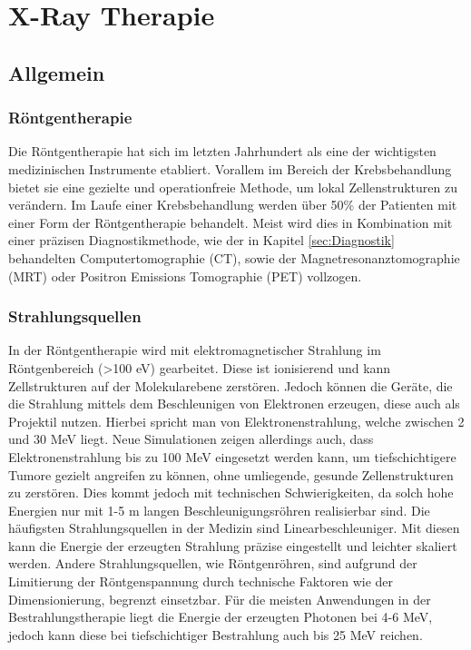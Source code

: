 \newpage
\section{X-Ray Therapie}

\subsection{Allgemein}


\subsubsection{Röntgentherapie}
Die Röntgentherapie hat sich im letzten Jahrhundert als eine der wichtigsten medizinischen Instrumente etabliert.
Vorallem im Bereich der Krebsbehandlung bietet sie eine gezielte und operationfreie Methode, um lokal Zellenstrukturen zu verändern.
Im Laufe einer Krebsbehandlung werden über 50\% der Patienten mit einer Form der Röntgentherapie behandelt.
Meist wird dies in Kombination mit einer präzisen Diagnostikmethode, wie der in Kapitel \ref{sec:Diagnostik} behandelten Computertomographie (CT), sowie
der Magnetresonanztomographie (MRT) oder Positron Emissions Tomographie (PET) vollzogen. \cite{hoskin2019external}
\subsubsection{Strahlungsquellen}
In der Röntgentherapie wird mit elektromagnetischer Strahlung im Röntgenbereich (>100 eV) gearbeitet. 
Diese ist ionisierend und kann Zellstrukturen auf der Molekularebene zerstören.
Jedoch können die Geräte, die die Strahlung mittels dem Beschleunigen von Elektronen erzeugen, diese auch als Projektil nutzen.
Hierbei spricht man von Elektronenstrahlung, welche zwischen 2 und 30 MeV liegt.
Neue Simulationen zeigen allerdings auch, dass Elektronenstrahlung bis zu 100 MeV eingesetzt werden kann, um tiefschichtigere Tumore gezielt angreifen zu können, ohne umliegende, gesunde Zellenstrukturen zu zerstören.
Dies kommt jedoch mit technischen Schwierigkeiten, da solch hohe Energien nur mit 1-5 m langen Beschleunigungsröhren realisierbar sind. \cite{shady_author}
Die häufigsten Strahlungsquellen in der Medizin sind Linearbeschleuniger.
Mit diesen kann die Energie der erzeugten Strahlung präzise eingestellt und leichter skaliert werden.
Andere Strahlungsquellen, wie Röntgenröhren, sind aufgrund der Limitierung der Röntgenspannung durch technische Faktoren wie der Dimensionierung, begrenzt einsetzbar.
Für die meisten Anwendungen in der Bestrahlungstherapie liegt die Energie der erzeugten Photonen bei 4-6 MeV, jedoch kann diese bei tiefschichtiger Bestrahlung auch bis 25 MeV reichen. \cite{KriegerHannoSfTu}









